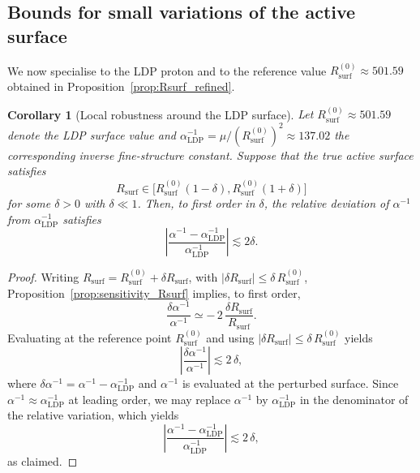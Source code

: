 \documentclass[11pt,a4paper]{article}
\theoremstyle{plain}
\newtheorem{corollary}{Corollary}
\theoremstyle{definition}
\theoremstyle{remark}
\begin{document}
\subsection{Bounds for small variations of the active surface}

We now specialise to the LDP proton and to the reference value
\(R_{\mathrm{surf}}^{(0)} \approx 501.59\) obtained in Proposition~\ref{prop:Rsurf_refined}.

\begin{corollary}[Local robustness around the LDP surface]
  \label{cor:local_robustness}
  Let \(R_{\mathrm{surf}}^{(0)} \approx 501.59\) denote the LDP surface value and
  \(\alpha^{-1}_{\mathrm{LDP}} = \mu / (R_{\mathrm{surf}}^{(0)})^2 \approx 137.02\) the
  corresponding inverse fine-structure constant. Suppose that the true active surface satisfies
  \[
    R_{\mathrm{surf}} \in \bigl[ R_{\mathrm{surf}}^{(0)}(1 - \delta),
                               R_{\mathrm{surf}}^{(0)}(1 + \delta) \bigr]
  \]
  for some \(\delta > 0\) with \(\delta \ll 1\). Then, to first order in \(\delta\), the relative deviation of \(\alpha^{-1}\) from \(\alpha^{-1}_{\mathrm{LDP}}\) satisfies
  \[
    \left| \frac{\alpha^{-1} - \alpha^{-1}_{\mathrm{LDP}}}{\alpha^{-1}_{\mathrm{LDP}}} \right|
    \lesssim 2\delta.
  \]
\end{corollary}

\begin{proof}
  Writing \(R_{\mathrm{surf}} = R_{\mathrm{surf}}^{(0)} + \delta R_{\mathrm{surf}}\),
  with \(|\delta R_{\mathrm{surf}}| \leq \delta\, R_{\mathrm{surf}}^{(0)}\),
  Proposition~\ref{prop:sensitivity_Rsurf} implies, to first order,
  \[
    \frac{\delta \alpha^{-1}}{\alpha^{-1}}
    \simeq -\,2\,\frac{\delta R_{\mathrm{surf}}}{R_{\mathrm{surf}}}.
  \]
  Evaluating at the reference point \(R_{\mathrm{surf}}^{(0)}\) and using
  \(|\delta R_{\mathrm{surf}}| \leq \delta\, R_{\mathrm{surf}}^{(0)}\) yields
  \[
    \left| \frac{\delta \alpha^{-1}}{\alpha^{-1}} \right|
    \lesssim 2\,\delta,
  \]
  where \(\delta \alpha^{-1} = \alpha^{-1} - \alpha^{-1}_{\mathrm{LDP}}\) and
  \(\alpha^{-1}\) is evaluated at the perturbed surface.
  Since \(\alpha^{-1} \approx \alpha^{-1}_{\mathrm{LDP}}\) at leading order, we may
  replace \(\alpha^{-1}\) by \(\alpha^{-1}_{\mathrm{LDP}}\) in the denominator of the
  relative variation, which yields
  \[
    \left| \frac{\alpha^{-1} - \alpha^{-1}_{\mathrm{LDP}}}{\alpha^{-1}_{\mathrm{LDP}}} \right|
    \lesssim 2\,\delta,
  \]
  as claimed.
\end{proof}
\end{document}
